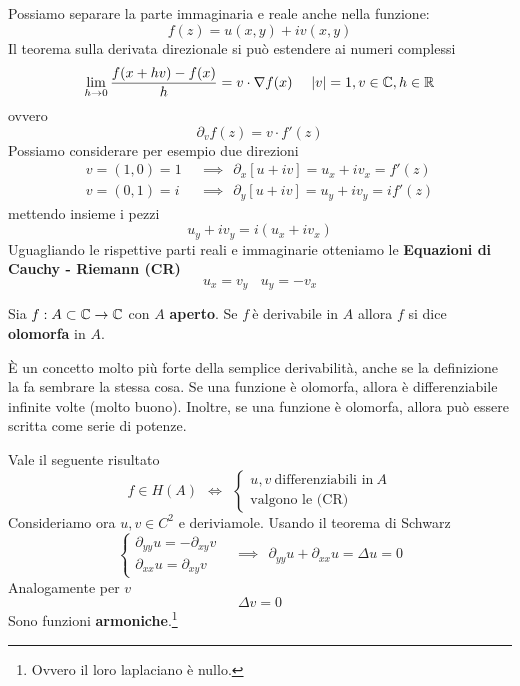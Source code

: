 Possiamo separare la parte immaginaria e reale anche nella funzione:
\begin{equation*}
f(z) = u(x, y) + iv(x, y)
\end{equation*}
Il teorema sulla derivata direzionale si può estendere ai numeri complessi
\begin{equation*}
\lim_{h\rightarrow 0}\frac{f(x + hv) - f(x)}{h} = v \cdot \nabla f(x) \ \ \ \ | v| = 1, v\in \mathbb{C}, h\in \mathbb{R}
\end{equation*}
ovvero
\begin{equation*}
\partial_{v} f(z) = v \cdot f'(z)
\end{equation*}
Possiamo considerare per esempio due direzioni
\begin{equation*}
\begin{aligned}
v = (1, 0) = 1 & \ \ \implies \ \ \partial_{x}[u + iv] = u_{x} + iv_{x} = f'(z)\\
v = (0, 1) = i & \ \ \implies \ \ \partial_{y}[u + iv] = u_{y} + iv_{y} = if'(z)
\end{aligned}
\end{equation*}
mettendo insieme i pezzi
\begin{equation*}
u_{y} + iv_{y} = i(u_{x} + iv_{x})
\end{equation*}
Uguagliando le rispettive parti reali e immaginarie otteniamo le \textbf{Equazioni di Cauchy - Riemann (CR)}
\begin{equation*}
\boxed{u_{x} = v_{y}} \ \ \ \ \boxed{u_{y} = - v_{x}}
\end{equation*}
\begin{defn}
Sia $f: A\subset \mathbb{C}\rightarrow \mathbb{C}$ con $A$ \textbf{aperto}. Se $f\ $è derivabile in $A$ allora $f$ si dice \textbf{olomorfa} in $A$.
\end{defn}
È un concetto molto più forte della semplice derivabilità, anche se la definizione la fa sembrare la stessa cosa. Se una funzione è olomorfa, allora è differenziabile infinite volte (molto buono). Inoltre, se una funzione è olomorfa, allora può essere scritta come serie di potenze.

Vale il seguente risultato
\begin{equation*}
\boxed{f\in H(A) \ \ \iff \ \
\begin{cases}
u, v\ \text{differenziabili in} \ A\\
\text{valgono le (CR)}
\end{cases}}
\end{equation*}
Consideriamo ora $u, v\in C^{2}$ e deriviamole. Usando il teorema di Schwarz
\begin{equation*}
\begin{cases}
\partial_{yy} u = - \partial_{xy} v\ \ \ \ \\
\partial_{xx} u = \partial_{xy} v
\end{cases} \implies \ \ \partial_{yy} u + \partial_{xx} u = \Delta u = 0
\end{equation*}
Analogamente per $v$
\begin{equation*}
\Delta v = 0
\end{equation*}
Sono funzioni \textbf{armoniche}.\footnote{Ovvero il loro laplaciano è nullo.}


